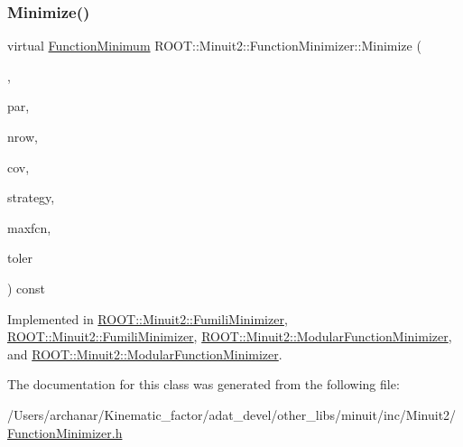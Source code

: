 \subsubsection{\texorpdfstring{Minimize()}{Minimize()}\hspace{0.1cm}{\footnotesize\ttfamily [8/8]}}
{\footnotesize\ttfamily virtual \mbox{\hyperlink{classROOT_1_1Minuit2_1_1FunctionMinimum}{Function\+Minimum}} R\+O\+O\+T\+::\+Minuit2\+::\+Function\+Minimizer\+::\+Minimize (\begin{DoxyParamCaption}\item[{const \mbox{\hyperlink{classROOT_1_1Minuit2_1_1FCNGradientBase}{F\+C\+N\+Gradient\+Base}} \&}]{,  }\item[{const std\+::vector$<$ double $>$ \&}]{par,  }\item[{unsigned int}]{nrow,  }\item[{const std\+::vector$<$ double $>$ \&}]{cov,  }\item[{unsigned int}]{strategy,  }\item[{unsigned int}]{maxfcn,  }\item[{double}]{toler }\end{DoxyParamCaption}) const\hspace{0.3cm}{\ttfamily [pure virtual]}}



Implemented in \mbox{\hyperlink{classROOT_1_1Minuit2_1_1FumiliMinimizer_aa17be65e26311aa25f6fd3680f747958}{R\+O\+O\+T\+::\+Minuit2\+::\+Fumili\+Minimizer}}, \mbox{\hyperlink{classROOT_1_1Minuit2_1_1FumiliMinimizer_aa17be65e26311aa25f6fd3680f747958}{R\+O\+O\+T\+::\+Minuit2\+::\+Fumili\+Minimizer}}, \mbox{\hyperlink{classROOT_1_1Minuit2_1_1ModularFunctionMinimizer_a1cab3c0cc40932cb9287232fe9cf7437}{R\+O\+O\+T\+::\+Minuit2\+::\+Modular\+Function\+Minimizer}}, and \mbox{\hyperlink{classROOT_1_1Minuit2_1_1ModularFunctionMinimizer_a97334cf66537c195aa8d6df14e745bef}{R\+O\+O\+T\+::\+Minuit2\+::\+Modular\+Function\+Minimizer}}.



The documentation for this class was generated from the following file\+:\begin{DoxyCompactItemize}
\item 
/\+Users/archanar/\+Kinematic\+\_\+factor/adat\+\_\+devel/other\+\_\+libs/minuit/inc/\+Minuit2/\mbox{\hyperlink{other__libs_2minuit_2inc_2Minuit2_2FunctionMinimizer_8h}{Function\+Minimizer.\+h}}\end{DoxyCompactItemize}
